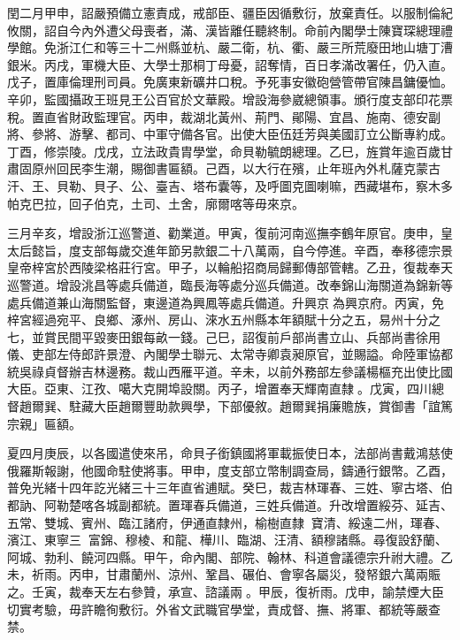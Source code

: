 \begin{pinyinscope}
閏二月甲申，詔嚴預備立憲責成，戒部臣、疆臣因循敷衍，放棄責任。以服制倫紀攸關，詔自今內外遭父母喪者，滿、漢皆離任聽終制。命前內閣學士陳寶琛總理禮學館。免浙江仁和等三十二州縣並杭、嚴二衛，杭、衢、嚴三所荒廢田地山塘丁漕銀米。丙戌，軍機大臣、大學士那桐丁母憂，詔奪情，百日孝滿改署任，仍入直。戊子，置庫倫理刑司員。免廣東新礦井口稅。予死事安徽砲營管帶官陳昌鏞優恤。辛卯，監國攝政王班見王公百官於文華殿。增設海參崴總領事。頒行度支部印花票稅。置直省財政監理官。丙申，裁湖北黃州、荊門、鄖陽、宜昌、施南、德安副將、參將、游擊、都司、中軍守備各官。出使大臣伍廷芳與美國訂立公斷專約成。丁酉，修崇陵。戊戌，立法政貴胄學堂，命貝勒毓朗總理。乙巳，旌賞年逾百歲甘肅固原州回民李生潮，賜御書匾額。己酉，以大行在殯，止年班內外札薩克蒙古汗、王、貝勒、貝子、公、臺吉、塔布囊等，及呼圖克圖喇嘛，西藏堪布，察木多帕克巴拉，回子伯克，土司、土舍，廓爾喀等毋來京。

三月辛亥，增設浙江巡警道、勸業道。甲寅，復前河南巡撫李鶴年原官。庚申，皇太后懿旨，度支部每歲交進年節另款銀二十八萬兩，自今停進。辛酉，奉移德宗景皇帝梓宮於西陵梁格莊行宮。甲子，以輪船招商局歸郵傳部管轄。乙丑，復裁奉天巡警道。增設洮昌等處兵備道，臨長海等處分巡兵備道。改奉錦山海關道為錦新等處兵備道兼山海關監督，東邊道為興鳳等處兵備道。升興京為興京府。丙寅，免梓宮經過宛平、良鄉、涿州、房山、淶水五州縣本年額賦十分之五，易州十分之七，並賞民間平毀麥田銀每畝一錢。己巳，詔復前戶部尚書立山、兵部尚書徐用儀、吏部左侍郎許景澄、內閣學士聯元、太常寺卿袁昶原官，並賜謚。命陸軍協都統吳祿貞督辦吉林邊務。裁山西雁平道。辛未，以前外務部左參議楊樞充出使比國大臣。亞東、江孜、噶大克開埠設關。丙子，增置奉天輝南直隸。戊寅，四川總督趙爾巽、駐藏大臣趙爾豐助款興學，下部優敘。趙爾巽捐廉贍族，賞御書「誼篤宗親」匾額。

夏四月庚辰，以各國遣使來吊，命貝子銜鎮國將軍載振使日本，法部尚書戴鴻慈使俄羅斯報謝，他國命駐使將事。甲申，度支部立幣制調查局，鑄通行銀幣。乙酉，普免光緒十四年訖光緒三十三年直省逋賦。癸巳，裁吉林琿春、三姓、寧古塔、伯都訥、阿勒楚喀各城副都統。置琿春兵備道，三姓兵備道。升改增置綏芬、延吉、五常、雙城、賓州、臨江諸府，伊通直隸州，榆樹直隸，寶清、綏遠二州，琿春、濱江、東寧三，富錦、穆棱、和龍、樺川、臨湖、汪清、額穆諸縣。尋復設舒蘭、阿城、勃利、饒河四縣。甲午，命內閣、部院、翰林、科道會議德宗升祔大禮。乙未，祈雨。丙申，甘肅蘭州、涼州、鞏昌、碾伯、會寧各屬災，發帑銀六萬兩賑之。壬寅，裁奉天左右參贊，承宣、諮議兩。甲辰，復祈雨。戊申，諭禁煙大臣切實考驗，毋許瞻徇敷衍。外省文武職官學堂，責成督、撫、將軍、都統等嚴查禁。


\end{pinyinscope}
